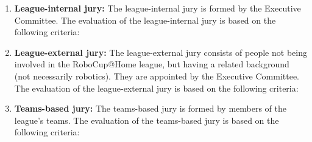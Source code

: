 \begin{enumerate}
\item\textbf{League-internal jury:} The league-internal jury is formed by the Executive Committee.
The evaluation of the league-internal jury is based on the following criteria:

\item \textbf{League-external jury:} The league-external jury consists of people not being involved in the RoboCup@Home league,
but having a related background (not necessarily robotics).
They are appointed by the Executive Committee.
The evaluation of the league-external jury is based on the following criteria:

\item\textbf{Teams-based jury:} The teams-based jury is formed by members of the league's teams.
The evaluation of the teams-based jury is based on the following criteria:
\end{enumerate}


